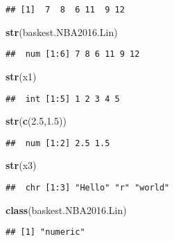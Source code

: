 \documentclass[]{article}
\newenvironment{Shaded}{\begin{snugshade}}{\end{snugshade}}
\newcommand{\FloatTok}[1]{\textcolor[rgb]{0.00,0.00,0.81}{#1}}
\newcommand{\KeywordTok}[1]{\textcolor[rgb]{0.13,0.29,0.53}{\textbf{#1}}}
\newcommand{\NormalTok}[1]{#1}
\begin{document}
\begin{verbatim}
## [1]  7  8  6 11  9 12
\end{verbatim}

\begin{Shaded}
\begin{Highlighting}[]
\KeywordTok{str}\NormalTok{(baskest.NBA2016.Lin)}
\end{Highlighting}
\end{Shaded}

\begin{verbatim}
##  num [1:6] 7 8 6 11 9 12
\end{verbatim}

\begin{Shaded}
\begin{Highlighting}[]
\KeywordTok{str}\NormalTok{(x1)}
\end{Highlighting}
\end{Shaded}

\begin{verbatim}
##  int [1:5] 1 2 3 4 5
\end{verbatim}

\begin{Shaded}
\begin{Highlighting}[]
\KeywordTok{str}\NormalTok{(}\KeywordTok{c}\NormalTok{(}\FloatTok{2.5}\NormalTok{,}\FloatTok{1.5}\NormalTok{))}
\end{Highlighting}
\end{Shaded}

\begin{verbatim}
##  num [1:2] 2.5 1.5
\end{verbatim}

\begin{Shaded}
\begin{Highlighting}[]
\KeywordTok{str}\NormalTok{(x3)}
\end{Highlighting}
\end{Shaded}

\begin{verbatim}
##  chr [1:3] "Hello" "r" "world"
\end{verbatim}

\begin{Shaded}
\begin{Highlighting}[]
\KeywordTok{class}\NormalTok{(baskest.NBA2016.Lin)}
\end{Highlighting}
\end{Shaded}

\begin{verbatim}
## [1] "numeric"
\end{verbatim}
\end{document}
